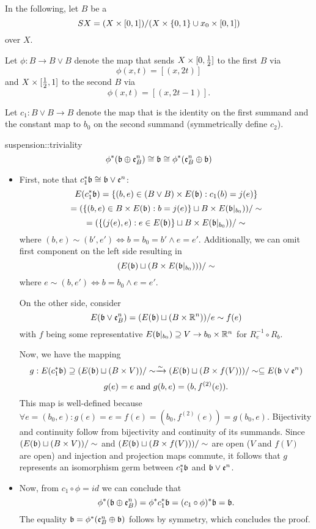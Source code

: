 \begin{myparagraph}
    In the following, let $B$ be a 
    \[ SX = (X \times [0, 1]) / (X \times \{ 0, 1 \} \cup x_0 \times [0, 1])\]
    over $X$.

    Let $\phi: B \to B \vee B$ denote the map that sends
    $X \times [0, \frac{1}{2}]$ to the first $B$ via
    \[ \phi(x, t) = [(x, 2t)] \]
    and $X \times [\frac{1}{2}, 1]$ to the second $B$ via
    \[ \phi(x, t) = [(x, 2t - 1)]. \]

    Let $c_1: B \vee B \to B$ denote the map that is the identity on the first summand
    and the constant map to $b_0$ on the second summand (symmetrically define $c_2$).
\end{myparagraph}

\begin{mylemma}{suspension::triviality}
    \[ \phi^*(\mathfrak{b} \oplus \mathfrak{e}^{n}_B) \cong \mathfrak{b} \cong \phi^*(\mathfrak{e}^{n}_B \oplus \mathfrak{b}) \]
\end{mylemma}
\begin{myproof}
    \begin{itemize}
        \item First, note that $c_1^*\mathfrak{b} \cong \mathfrak{b} \vee \mathfrak{e}^{n}$:
        \[ E(c_1^*\mathfrak{b}) = \{(b, e) \in (B \vee B) \times E(\mathfrak{b}):c_1(b) = j(e)\} \]
        \[ = (\{(b, e) \in B \times E(\mathfrak{b}):b = j(e)\} \sqcup B \times E(\mathfrak{b}\vert_{b_0})) / \sim \]
        \[ = (\{(j(e), e):e \in E(\mathfrak{b})\} \sqcup B \times E(\mathfrak{b}\vert_{b_0})) / \sim \]
        where $(b, e) \sim (b', e') \iff b = b_0 = b' \land e = e'$.
        Additionally, we can omit first component on the left side resulting in
        \[ (E(\mathfrak{b}) \sqcup (B \times E(\mathfrak{b}\vert_{b_0}))) / \sim \]
        where $e \sim (b, e') \iff b = b_0 \land e = e'$.
        
        On the other side, consider
        \[ E(\mathfrak{b} \vee \mathfrak{e}^{n}_B) = (E(\mathfrak{b}) \sqcup (B \times \mathbb{R}^n)) / e \sim f(e) \]
        with $f$ being some representative $E(\mathfrak{b}\vert_{b_0}) \supseteq{} V \to b_0 \times \mathbb{R}^n$ for $R_e^{-1} \circ R_b$.
        
        Now, we have the mapping
        \[ g: E(c_1^*\mathfrak{b}) \supseteq{} (E(\mathfrak{b}) \sqcup (B \times V)) / \sim \xrightarrow{\sim} (E(\mathfrak{b}) \sqcup (B \times f(V))) / \sim \subseteq{} E(\mathfrak{b} \vee \mathfrak{e}^{n}) \]
        \[ g(e) = e \text{ and } g(b, e) = (b, f^{(2)}(e)). \]
        This map is well-defined because $\forall e = (b_0, e): g(e) = e = f(e) = (b_0, f^{(2)}(e)) = g(b_0, e)$.
        Bijectivity and continuity follow from bijectivity and continuity of its summands.
        Since $(E(\mathfrak{b}) \sqcup (B \times V)) / \sim$ and $(E(\mathfrak{b}) \sqcup (B \times f(V))) / \sim$ are open ($V$ and $f(V)$ are open)
        and injection and projection maps commute, it follows that $g$ represents an isomorphism germ between $c_1^*\mathfrak{b}$ and $\mathfrak{b} \vee \mathfrak{e}^{n}$.
        \item Now, from $c_1 \circ \phi = id$ we can conclude that
        \[ \phi^*(\mathfrak{b} \oplus \mathfrak{e}^{n}_B) = \phi^*c_1^*\mathfrak{b} = (c_1 \circ \phi)^*\mathfrak{b} = \mathfrak{b}. \]
        The equality $\mathfrak{b} = \phi^*(\mathfrak{e}^{n}_B \oplus \mathfrak{b})$ follows by symmetry, which concludes the proof.
    \end{itemize}
\end{myproof}

